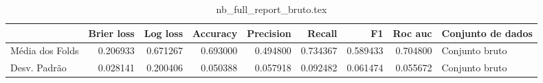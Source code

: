 \begin{table}
\centering
\caption{nb_full_report_bruto.tex}
\label{nb_full_report_bruto.tex}
\begin{tabular}{lrrrrrrrl}
\toprule
{} &  Brier  loss &  Log loss &  Accuracy  &  Precision  &   Recall  &       F1  &  Roc auc  & Conjunto de dados \\
\midrule
Média dos Folds &     0.206933 &  0.671267 &   0.693000 &    0.494800 &  0.734367 &  0.589433 &  0.704800 &    Conjunto bruto \\
Desv. Padrão    &     0.028141 &  0.200406 &   0.050388 &    0.057918 &  0.092482 &  0.061474 &  0.055672 &    Conjunto bruto \\
\bottomrule
\end{tabular}
\end{table}
